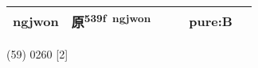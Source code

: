 \documentclass[14pt,a4paper]{scrartcl}
\begin{document}
\begin{longtable}[c]{@{}llllll@{}}
\begin{minipage}[t]{0.14\columnwidth}
ngjwon
\strut\end{minipage} &
\begin{minipage}[t]{0.14\columnwidth}\raggedright\strut
原\textsuperscript{539f~ngjwon}
\strut\end{minipage} &
\begin{minipage}[t]{0.14\columnwidth}\raggedright\strut
\strut\end{minipage} &
\begin{minipage}[t]{0.14\columnwidth}\raggedright\strut
\strut\end{minipage} &
\begin{minipage}[t]{0.14\columnwidth}\raggedright\strut
pure:B
\strut\end{minipage}\tabularnewline
\bottomrule
\end{longtable}

(59) 0260 {[}2{]}
\end{document}

